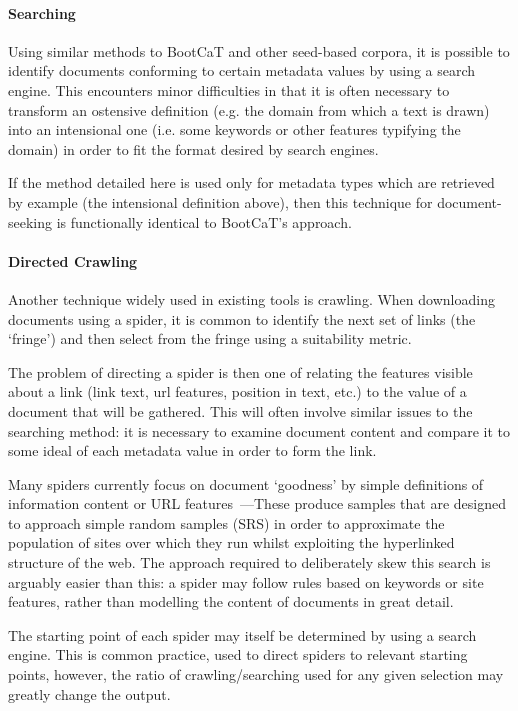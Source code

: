 \paragraph{Searching}
\label{sec:rebuilding:design:searching}
Using similar methods to BootCaT and other seed-based corpora, it is possible to identify documents conforming to certain metadata values by using a search engine.  This encounters minor difficulties in that it is often necessary to transform an ostensive definition (e.g. the domain from which a text is drawn) into an intensional one (i.e. some keywords or other features typifying the domain) in order to fit the format desired by search engines.

If the method detailed here is used only for metadata types which are retrieved by example (the intensional definition above), then this technique for document-seeking is functionally identical to BootCaT's approach.



\paragraph{Directed Crawling}
Another technique widely used in existing tools is crawling.  When downloading documents using a spider, it is common to identify the next set of links (the `fringe') and then select from the fringe using a suitability metric.

The problem of directing a spider is then one of relating the features visible about a link (link text, url features, position in text, etc.) to the value of a document that will be gathered.  This will often involve similar issues to the searching method: it is necessary to examine document content and compare it to some ideal of each metadata value in order to form the link.

Many spiders currently focus on document `goodness' by simple definitions of information content or URL features~\cite{schafer2014focused,ferraresi2008introducing}---These produce samples that are designed to approach simple random samples (SRS) in order to approximate the population of sites over which they run whilst exploiting the hyperlinked structure of the web.  The approach required to deliberately skew this search is arguably easier than this: a spider may follow rules based on keywords or site features, rather than modelling the content of documents in great detail.

The starting point of each spider may itself be determined by using a search engine.  This is common practice, used to direct spiders to relevant starting points, however, the ratio of crawling/searching used for any given selection may greatly change the output.



